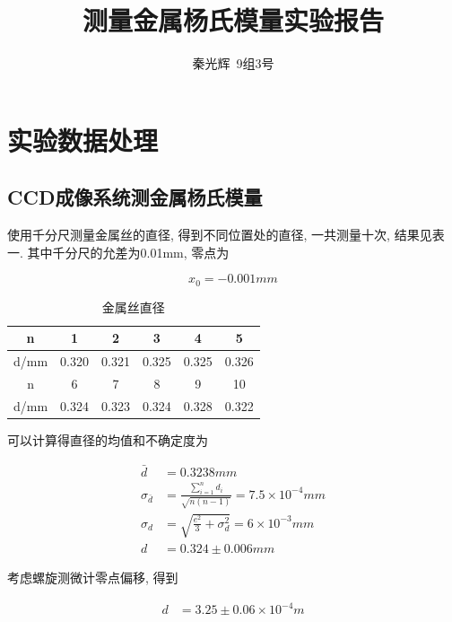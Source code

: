 \documentclass[a4paper,10pt,notitlepage]{article}
\begin{document}
\title{测量金属杨氏模量实验报告}
\author{秦光辉\ 9组3号}
\maketitle

\section{实验数据处理}

\subsection{CCD成像系统测金属杨氏模量}

	使用千分尺测量金属丝的直径, 得到不同位置处的直径, 一共测量十次, 结果见表一. 其中千分尺的允差为0.01mm, 零点为
	
\begin{equation*}
	x_0 = -0.001mm
\end{equation*}

\begin{center}

	\begin{longtable}{|c|c|c|c|c|c|}
	\caption{金属丝直径} \\
	\hline
	n & 1 & 2 & 3 & 4 & 5 \\
	\hline
	d/mm & 0.320 & 0.321 & 0.325 & 0.325 & 0.326 \\
	\hline
	\hline
	n & 6 & 7 & 8 & 9 & 10 \\
	\hline
	d/mm & 0.324 & 0.323 & 0.324 & 0.328 & 0.322 \\
	\hline
	\end{longtable}

\end{center}

	可以计算得直径的均值和不确定度为
	
\begin{align*}
	\bar{d} &= 0.3238 mm \\
	\sigma_{\bar{d}} &= \frac{\sum_{i = 1}^{n}d_i}{\sqrt{n(n-1)}} = 7.5 \times 10^{-4} mm \\
	\sigma_d &= \sqrt{\frac{e^2}{3} + \sigma_d ^ 2} = 6 \times 10^{-3} mm \\
	d &= 0.324 \pm 0.006 mm
\end{align*}

	考虑螺旋测微计零点偏移, 得到
	
\begin{align*}
	d &= 3.25 \pm 0.06 \times 10^{-4} m
\end{align*}
\end{document}
